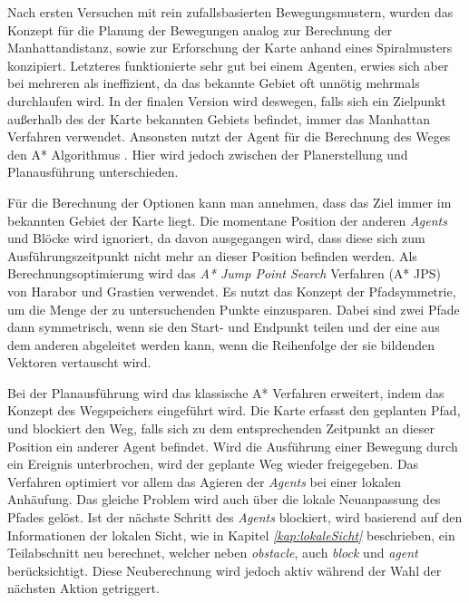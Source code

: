 Nach ersten Versuchen mit rein zufallsbasierten Bewegungsmustern, wurden das Konzept für die Planung der Bewegungen analog zur Berechnung der Manhattandistanz, sowie zur Erforschung der Karte anhand eines Spiralmusters konzipiert. Letzteres funktionierte sehr gut bei einem Agenten, erwies sich aber bei mehreren als ineffizient, da das bekannte Gebiet oft unnötig mehrmals durchlaufen wird. In der finalen Version wird deswegen, falls sich ein Zielpunkt außerhalb des der Karte bekannten Gebiets befindet, immer das \glqq Manhattan \grqq{} Verfahren verwendet. Ansonsten nutzt der Agent für die Berechnung des Weges den A* Algorithmus \cite{ref_proc1}. Hier wird jedoch zwischen der Planerstellung und Planausführung unterschieden. \newline

Für die Berechnung der Optionen kann man annehmen, dass das Ziel immer im bekannten Gebiet der Karte liegt. Die momentane Position der anderen \textit{Agents} und Blöcke wird ignoriert, da davon ausgegangen wird, dass diese sich zum Ausführungszeitpunkt nicht mehr an dieser Position befinden werden. Als Berechnungsoptimierung wird das \textit{A* Jump Point Search} Verfahren (A* JPS) \cite{ref_proc2} von Harabor und Grastien verwendet. Es nutzt das Konzept der Pfadsymmetrie, um die Menge der zu untersuchenden Punkte einzusparen. Dabei sind zwei Pfade dann symmetrisch, wenn sie den Start- und Endpunkt teilen und der eine aus dem anderen abgeleitet werden kann, wenn die Reihenfolge der sie bildenden Vektoren vertauscht wird. \newline

Bei der Planausführung wird das klassische A* Verfahren erweitert, indem das Konzept des Wegspeichers eingeführt wird. Die Karte erfasst den geplanten Pfad, und blockiert den Weg, falls sich zu dem entsprechenden Zeitpunkt an dieser Position ein anderer Agent befindet.  Wird die Ausführung einer Bewegung durch ein Ereignis unterbrochen, wird der geplante Weg wieder freigegeben. Das Verfahren optimiert vor allem das Agieren der \textit{Agents} bei einer lokalen Anhäufung. Das gleiche Problem wird auch über die lokale Neuanpassung des Pfades gelöst. Ist der nächste Schritt des \textit{Agents} blockiert, wird basierend auf den Informationen der lokalen Sicht, wie in Kapitel \textit{\ref{kap:lokaleSicht}} beschrieben, ein Teilabschnitt neu berechnet, welcher neben \textit{obstacle}, auch \textit{block} und \textit{agent} berücksichtigt. Diese Neuberechnung wird jedoch aktiv während der Wahl der nächsten Aktion getriggert. \newline

